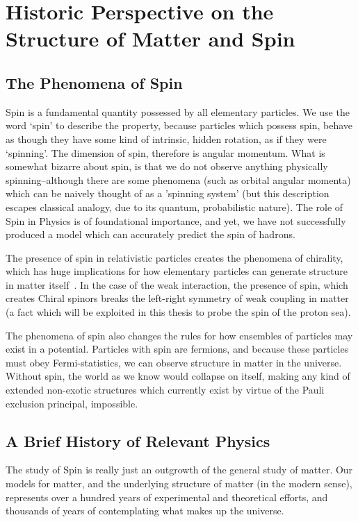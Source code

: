 \chapter{Historic Perspective on the Structure of Matter and Spin}
\section{The Phenomena of Spin}

Spin is a fundamental quantity possessed by all elementary particles. We use
the word `spin' to describe the property, because particles which possess spin,
behave as though they have some kind of intrinsic, hidden rotation, as if they
were `spinning'. The dimension of spin, therefore is angular momentum. What is
somewhat bizarre about spin, is that we do not observe anything physically
spinning--although there are some phenomena (such as orbital angular momenta)
which can be naively thought of as a 'spinning system' (but this description
escapes classical analogy, due to its quantum, probabilistic nature). The role
of Spin in Physics is of foundational importance, and yet, we have not
successfully produced a model which can accurately predict the spin of hadrons.

The presence of spin in relativistic particles creates the phenomena of
chirality, which has huge implications for how elementary particles can generate
structure in matter itself~\cite{Brodsky1988}. In the case of the weak
interaction, the presence of spin, which creates Chiral spinors breaks the
left-right symmetry of weak coupling in matter (a fact which will be exploited
in this thesis to probe the spin of the proton sea).

The phenomena of spin also changes the rules for how ensembles of particles may
exist in a potential. Particles with spin are fermions, and because these
particles must obey Fermi-statistics, we can observe structure in matter in the
universe. Without spin, the world as we know would collapse on itself, making
any kind of extended non-exotic structures which currently exist by virtue of
the Pauli exclusion principal, impossible.

\clearpage
\section{A Brief History of Relevant Physics}

The study of Spin is really just an outgrowth of the general study of matter.
Our models for matter, and the underlying structure of matter (in the modern
sense), represents over a hundred years of experimental and theoretical efforts,
and thousands of years of contemplating what makes up the universe.

